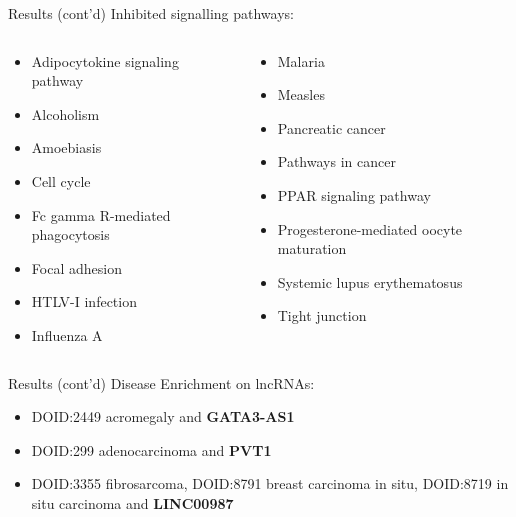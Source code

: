 \documentclass{beamer}
\begin{document}
\begin{frame}{Results (cont'd)}
	Inhibited signalling pathways:
	\begin{columns}
		\begin{column}[t]{.48\textwidth}
			\begin{itemize}
				\item Adipocytokine signaling pathway
				\item Alcoholism
				\item Amoebiasis
				\item Cell cycle
				\item Fc gamma R-mediated phagocytosis
				\item Focal adhesion
				\item HTLV-I infection
				\item Influenza A
			\end{itemize}
		\end{column}
		\begin{column}[t]{.48\textwidth}
			\begin{itemize}
				\item Malaria
				\item Measles
				\item Pancreatic cancer
				\item Pathways in cancer
				\item PPAR signaling pathway
				\item Progesterone-mediated oocyte maturation
				\item Systemic lupus erythematosus
				\item Tight junction
			\end{itemize}
		\end{column}
	\end{columns}
\end{frame}
\begin{frame}{Results (cont'd)}
	Disease Enrichment on lncRNAs:
	\begin{itemize}
		\item DOID:2449 acromegaly and \textbf{GATA3-AS1}
		\item DOID:299 adenocarcinoma and \textbf{PVT1}
		\item DOID:3355 fibrosarcoma, DOID:8791 breast carcinoma in situ, DOID:8719 in situ carcinoma and \textbf{LINC00987}
	\end{itemize}
\end{frame}
\end{document}
